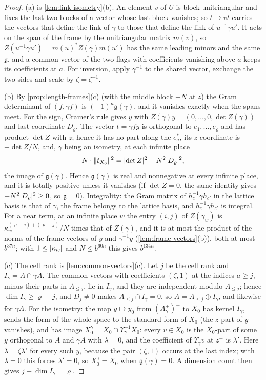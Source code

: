 \begin{proof}
(a) is \cref{lem:link-isometry}(b). An element $v$ of $U$ is block unitriangular and fixes the last two blocks of a vector whose last block vanishes; so $t\mapsto vt$ carries the vectors that define the link of $\gamma$ to those that define the link of $u^{-1}\gamma u'$. It acts on the span of
the frame by the unitriangular matrix $m(v)$, so $Z(u^{-1}\gamma u')=m(u)^*Z(\gamma)m(u')$ has the same leading minors and the same $\mathfrak g$, and a common vector of the two flags with coefficients vanishing above $a$ keeps its coefficients at $a$. For inversion,
apply $\gamma^{-1}$ to the shared vector, exchange the two sides and scale by $\bar\zeta=\zeta^{-1}$.

(b) By \cref{prop:length-frames}(c) (with the middle block $-N$ at $z$) the Gram determinant of $(f,\gamma f)$ is $(-1)^n\mathfrak g(\gamma)$, and it vanishes exactly when the spans meet. For the sign, Cramer's rule gives $y$ with $Z(\gamma)y=(0,\dots,0,\det Z(\gamma))$
and last coordinate $D_\varrho$. The vector $t=\gamma fy$ is orthogonal to $e_1,\dots,e_\varrho$ and has product $\det Z$ with $z$; hence it has no part along the $e^*_a$, its $z$-coordinate is $-\det Z/N$, and, $\gamma$ being an isometry, at each infinite place
\[
  N\cdot\lVert t_{X_0}\rVert^2=\lvert \det Z\rvert^2-N^2\lvert D_\varrho\rvert^2,
\]
the image of $\mathfrak g(\gamma)$. Hence $\mathfrak g(\gamma)$ is real and nonnegative at every infinite place, and it is totally positive unless it vanishes (if $\det Z=0$, the same identity gives $-N^2\lvert D_\varrho\rvert^2\ge0$, so $\mathfrak g=0$). Integrality: the Gram matrix of
$h_c^{-1}\gamma h_{c'}$ in the lattice basis is that of $\gamma$, the frame belongs to the lattice basis, and $h_c^{-1}\gamma h_{c'}$ is integral. For a near term, at an infinite place $w$ the entry $(i,j)$ of $Z(\gamma_w)$ is $\kappa_w^{(\varrho-i)+(\varrho-j)}/N$ times that of $Z(\gamma)$, and
it is at most the product of the norms of the frame vectors of $y$ and $\gamma^{-1}y$ (\cref{lem:frame-vectors}(b)), both at most $b^{37n}$; with $1\le\lvert \kappa_w\rvert$ and $N\le b^{60n}$ this gives $b^{134n}$.

(c) The cell rank is \cref{lem:common-vectors}(c). Let $j$ be the cell rank and $I_\gamma=A\cap\gamma A$. The common vectors with coefficients $(\zeta,1)$ at the indices $a\ge j$, minus their parts in $A_{\le j}$, lie in $I_\gamma$, and they are independent modulo $A_{\le j}$; hence $\dim I_\gamma\ge\varrho-j$, and
$D_j\ne0$ makes $A_{\le j}\cap I_\gamma=0$, so $A=A_{\le j}\oplus I_\gamma$, and likewise for $\gamma A$. For the isometry: the map $y\mapsto y_0$ from $(A^+_\gamma)^\perp$ to $X_0$ has kernel $I_\gamma$, sends the form of the whole space to the standard form of $X_0$ (the $z$-part of $y$ vanishes),
and has image $X_0^\gamma=X_0\cap\Upsilon_\gamma^{-1}X_0$: every $v\in X_0$ is the $X_0$-part of some $y$ orthogonal to $A$ and $\gamma A$ with $\lambda=0$, and the coefficient of $\Upsilon_\gamma v$ at $z^+$ is $\lambda'$. Here $\lambda=\bar\zeta\lambda'$ for every such $y$, because the pair $(\zeta,1)$ occurs at the
last index; with $\lambda=0$ this forces $\lambda'=0$, so $X_0^\gamma=X_0$ when $\mathfrak g(\gamma)=0$. A dimension count then gives $j+\dim I_\gamma=\varrho$.


\end{proof}
